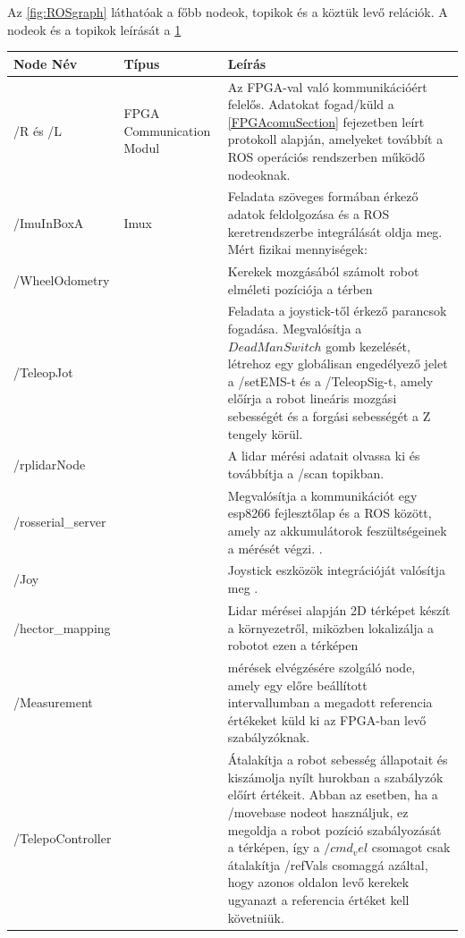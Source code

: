 Az \ref{fig:ROSgraph} láthatóak a főbb nodeok, topikok és a köztük levő relációk. A nodeok és a topikok leírását a \ref{Tab:nodok}

\begin{table}[H]
\centering
\begin{tabular}{lp{3cm}p{8cm}}
\hline Node Név & Típus & Leírás \\ \hline
  /R és /L      &  FPGA
  Communication
  Modul     &  Az FPGA-val való kommunikációért felelős. Adatokat fogad/küld  a \ref{FPGAcomuSection} fejezetben leírt protokoll alapján, amelyeket továbbít a ROS operációs rendszerben működő nodeoknak.     \\
  /ImuInBoxA       &    Imux   &  Feladata szöveges formában érkező adatok feldolgozása és a ROS keretrendszerbe integrálását oldja meg. Mért fizikai mennyiségek:       \\
  /WheelOdometry       &       &   Kerekek mozgásából számolt robot elméleti pozíciója a térben     \\
  /TeleopJot      &       & Feladata a joystick-től érkező parancsok fogadása. Megvalósítja a $Dead Man Switch$ gomb kezelését, létrehoz egy globálisan engedélyező jelet a /setEMS-t és a /TeleopSig-t, amely előírja a robot lineáris mozgási sebességét és a forgási sebességét a Z tengely körül.  \\
  /rplidarNode & & A lidar mérési adatait olvassa ki és továbbítja a /scan topikban.\\
  /rosserial\_server & & Megvalósítja a kommunikációt egy esp8266 fejlesztőlap és a ROS között, amely az akkumulátorok feszültségeinek a mérését végzi. \cite{RosSerial}.\\
  /Joy & & Joystick eszközök integrációját valósítja meg \cite{rosjoy}.\\
  /hector\_mapping & & Lidar mérései alapján 2D térképet készít a környezetről, miközben lokalizálja a robotot ezen a térképen \cite{roshectormap}\\
  /Measurement & & mérések elvégzésére szolgáló node, amely egy előre beállított intervallumban a megadott referencia értékeket küld ki az FPGA-ban levő szabályzóknak.\\
  /TelepoController & & Átalakítja a robot sebesség állapotait és kiszámolja nyílt hurokban a szabályzók előírt értékeit. Abban az esetben, ha a /movebase nodeot használjuk, ez megoldja a robot pozíció szabályozását a térképen, így a $/cmd_vel$ csomagot csak átalakítja /refVals csomaggá azáltal, hogy azonos oldalon levő kerekek ugyanazt a referencia értéket kell követniük.
  
\end{tabular}
 \label{Tab:nodok} 
\end{table}


